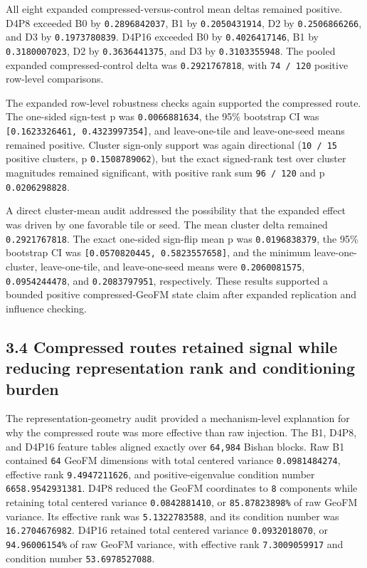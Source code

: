 \documentclass[
  11pt,
  a4paper,
]{article}
\begin{document}
All eight expanded compressed-versus-control mean deltas remained
positive. D4P8 exceeded B0 by \texttt{0.2896842037}, B1 by
\texttt{0.2050431914}, D2 by \texttt{0.2506866266}, and D3 by
\texttt{0.1973780839}. D4P16 exceeded B0 by \texttt{0.4026417146}, B1 by
\texttt{0.3180007023}, D2 by \texttt{0.3636441375}, and D3 by
\texttt{0.3103355948}. The pooled expanded compressed-control delta was
\texttt{0.2921767818}, with \texttt{74\ /\ 120} positive row-level
comparisons.

The expanded row-level robustness checks again supported the compressed
route. The one-sided sign-test p was \texttt{0.0066881634}, the 95\%
bootstrap CI was \texttt{{[}0.1623326461,\ 0.4323997354{]}}, and
leave-one-tile and leave-one-seed means remained positive. Cluster
sign-only support was again directional (\texttt{10\ /\ 15} positive
clusters, p \texttt{0.1508789062}), but the exact signed-rank test over
cluster magnitudes remained significant, with positive rank sum
\texttt{96\ /\ 120} and p \texttt{0.0206298828}.

A direct cluster-mean audit addressed the possibility that the expanded
effect was driven by one favorable tile or seed. The mean cluster delta
remained \texttt{0.2921767818}. The exact one-sided sign-flip mean p was
\texttt{0.0196838379}, the 95\% bootstrap CI was
\texttt{{[}0.0570820445,\ 0.5823557658{]}}, and the minimum
leave-one-cluster, leave-one-tile, and leave-one-seed means were
\texttt{0.2060081575}, \texttt{0.0954244478}, and \texttt{0.2083797951},
respectively. These results supported a bounded positive
compressed-GeoFM state claim after expanded replication and influence
checking.

\subsection{3.4 Compressed routes retained signal while reducing
representation rank and conditioning
burden}\label{compressed-routes-retained-signal-while-reducing-representation-rank-and-conditioning-burden}

The representation-geometry audit provided a mechanism-level explanation
for why the compressed route was more effective than raw injection. The
B1, D4P8, and D4P16 feature tables aligned exactly over \texttt{64,984}
Bishan blocks. Raw B1 contained \texttt{64} GeoFM dimensions with total
centered variance \texttt{0.0981484274}, effective rank
\texttt{9.4947211626}, and positive-eigenvalue condition number
\texttt{6658.9542931381}. D4P8 reduced the GeoFM coordinates to
\texttt{8} components while retaining total centered variance
\texttt{0.0842881410}, or \texttt{85.87823898\%} of raw GeoFM variance.
Its effective rank was \texttt{5.1322783588}, and its condition number
was \texttt{16.2704676982}. D4P16 retained total centered variance
\texttt{0.0932018070}, or \texttt{94.96006154\%} of raw GeoFM variance,
with effective rank \texttt{7.3009059917} and condition number
\texttt{53.6978527088}.
\end{document}
